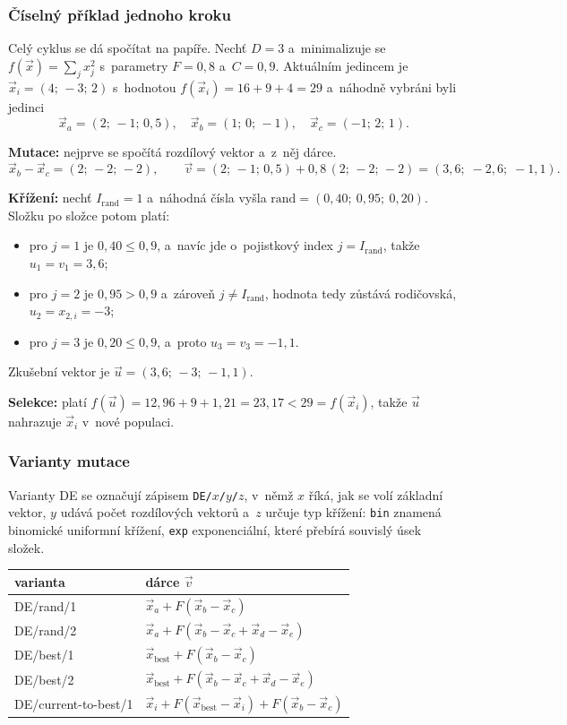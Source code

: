 \documentclass[11pt,a4paper]{article}
\theoremstyle{definition}
\begin{document}
\subsubsection{Číselný příklad jednoho kroku}

Celý cyklus se dá spočítat na papíře. Nechť $D = 3$ a~minimalizuje se
$f(\vec x) = \sum_j x_j^2$ s~parametry $F = 0{,}8$ a~$C = 0{,}9$. Aktuálním jedincem je
$\vec x_i = (4;\, -3;\, 2)$ s~hodnotou $f(\vec x_i) = 16+9+4 = 29$ a~náhodně vybráni byli
jedinci
\[
\vec x_a = (2;\, -1;\, 0{,}5), \quad
\vec x_b = (1;\, 0;\, -1), \quad
\vec x_c = (-1;\, 2;\, 1).
\]

\textbf{Mutace:} nejprve se spočítá rozdílový vektor a~z~něj dárce.
\[
\vec x_b - \vec x_c = (2;\, -2;\, -2), \qquad
\vec v = (2;\,-1;\,0{,}5) + 0{,}8\,(2;\,-2;\,-2) = (3{,}6;\; -2{,}6;\; -1{,}1).
\]

\textbf{Křížení:} nechť $I_{\mathrm{rand}} = 1$ a~náhodná čísla vyšla
$\mathrm{rand} = (0{,}40;\ 0{,}95;\ 0{,}20)$. Složku po složce potom platí:
\begin{itemize}
\item pro $j=1$ je $0{,}40 \le 0{,}9$, a~navíc jde o~pojistkový index
  $j = I_{\mathrm{rand}}$, takže $u_1 = v_1 = 3{,}6$;
\item pro $j=2$ je $0{,}95 > 0{,}9$ a~zároveň $j \ne I_{\mathrm{rand}}$, hodnota tedy
  zůstává rodičovská, $u_2 = x_{2,i} = -3$;
\item pro $j=3$ je $0{,}20 \le 0{,}9$, a~proto $u_3 = v_3 = -1{,}1$.
\end{itemize}
Zkušební vektor je $\vec u = (3{,}6;\, -3;\, -1{,}1)$.

\textbf{Selekce:} platí $f(\vec u) = 12{,}96 + 9 + 1{,}21 = 23{,}17 < 29 = f(\vec x_i)$,
takže $\vec u$ nahrazuje $\vec x_i$ v~nové populaci.

\subsubsection{Varianty mutace}

Varianty DE se označují zápisem \texttt{DE/$x$/$y$/$z$}, v~němž $x$ říká, jak se volí
základní vektor, $y$ udává počet rozdílových vektorů a~$z$ určuje typ křížení: \texttt{bin}
znamená binomické uniformní křížení, \texttt{exp} exponenciální, které přebírá souvislý
úsek složek.

\begin{center}
\begin{tabular}{@{}ll@{}}
\toprule
\textbf{varianta} & \textbf{dárce $\vec v$} \\
\midrule
DE/rand/1 & $\vec x_a + F(\vec x_b - \vec x_c)$ \\
DE/rand/2 & $\vec x_a + F(\vec x_b - \vec x_c + \vec x_d - \vec x_e)$ \\
DE/best/1 & $\vec x_{\mathrm{best}} + F(\vec x_b - \vec x_c)$ \\
DE/best/2 & $\vec x_{\mathrm{best}} + F(\vec x_b - \vec x_c + \vec x_d - \vec x_e)$ \\
DE/current-to-best/1 & $\vec x_i + F(\vec x_{\mathrm{best}} - \vec x_i) + F(\vec x_b - \vec x_c)$ \\
\bottomrule
\end{tabular}
\end{center}
\end{document}
